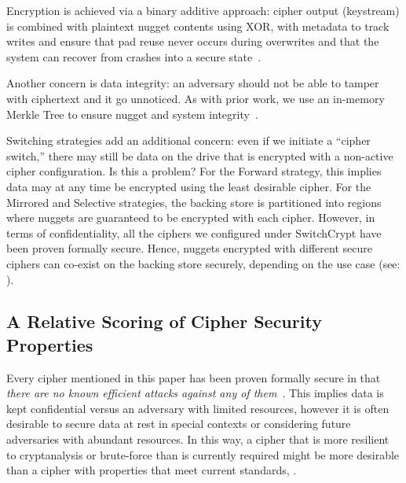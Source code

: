 Encryption is achieved via a binary additive approach: cipher output (keystream)
is combined with plaintext nugget contents using XOR, with metadata to track
writes and ensure that pad reuse never occurs during overwrites and that the
system can recover from crashes into a secure state~\cite{StrongBox}.

Another concern is data integrity: an adversary should not be able to tamper
with ciphertext and it go unnoticed. As with prior work, we use an in-memory
Merkle Tree to ensure nugget and system integrity~\cite{StrongBox}.

Switching strategies add an additional concern: even if we initiate a ``cipher
switch,'' there may still be data on the drive that is encrypted with a
non-active cipher configuration. Is this a problem? For the Forward strategy,
this implies data may at any time be encrypted using the least desirable cipher.
For the Mirrored and Selective strategies, the backing store is partitioned into
regions where nuggets are guaranteed to be encrypted with each cipher. However,
in terms of confidentiality, all the ciphers we configured under SwitchCrypt have
been proven formally secure. Hence, nuggets encrypted with different secure
ciphers can co-exist on the backing store securely, depending on the use case
(see: ).

\subsection{A Relative Scoring of Cipher Security Properties}

 

Every cipher mentioned in this paper has been proven formally secure in that
\emph{there are no known efficient attacks against any of them}~\cite{All,
Ciphers, Again}. This implies data is kept confidential versus an adversary with
limited resources, however it is often desirable to secure data at rest in
special contexts or considering future adversaries with abundant resources. 
In this way, a cipher that is more resilient to cryptanalysis or
brute-force than is currently required might be more desirable than a cipher
with properties that meet current standards, .

